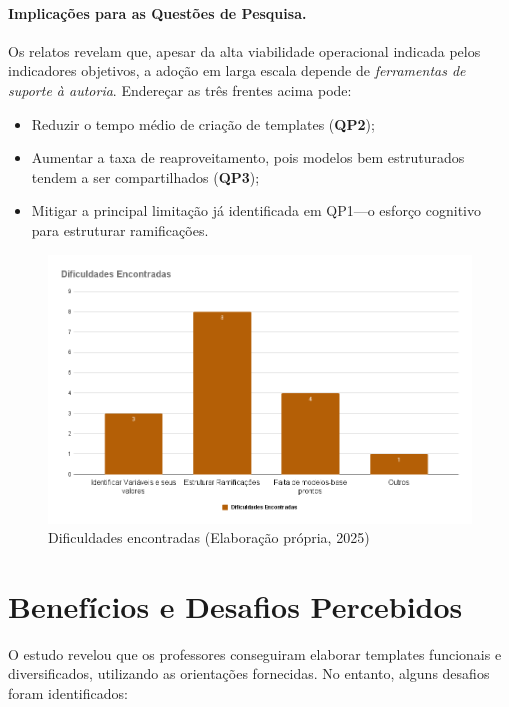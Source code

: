 \paragraph{Implicações para as Questões de Pesquisa.}
Os relatos revelam que, apesar da alta viabilidade operacional indicada pelos indicadores objetivos, a adoção em larga escala depende de \emph{ferramentas de suporte à autoria}.  Endereçar as três frentes acima pode:

\begin{itemize}
    \item Reduzir o tempo médio de criação de templates (\textbf{QP2});
    \item Aumentar a taxa de reaproveitamento, pois modelos bem estruturados tendem a ser compartilhados (\textbf{QP3});
    \item Mitigar a principal limitação já identificada em QP1—o esforço cognitivo para estruturar ramificações.
\end{itemize}

\begin{figure}[ht]
	\centering
	\includegraphics[width=16cm]{./imagens/capitulo8/dificuldades-encontradas}
	\caption{Dificuldades encontradas  (Elaboração própria, 2025) }
	\label{fig:dificuldades-encontradas}
\end{figure}

	

\section{Benefícios e Desafios Percebidos}


O estudo revelou que os professores conseguiram elaborar templates funcionais e diversificados, utilizando as orientações fornecidas. No entanto, alguns desafios foram identificados:

